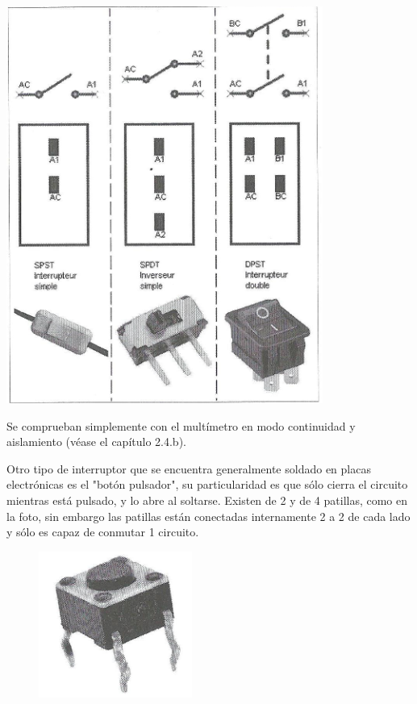 \documentclass[a5paper,twoside,openany]{book}
\begin{document}
\begin{minipage}[t]{0.6\textwidth}\vspace{0pt}
\includegraphics[width=\linewidth]{tipos-interruptores}
\end{minipage}
\vspace{1em}

Se comprueban simplemente con el multímetro en modo continuidad y aislamiento
(véase el capítulo 2.4.b).
\newpage

Otro tipo de interruptor que se encuentra generalmente soldado en placas electrónicas es el "botón pulsador", su particularidad es que sólo cierra el circuito mientras está pulsado, y lo abre al soltarse.
Existen de 2 y de 4 patillas, como en la foto, sin embargo las patillas están conectadas internamente 2 a 2 de cada lado y sólo es capaz de conmutar 1 circuito.

\begin{figure}[h]
\includegraphics[width=0.25\linewidth]{boton-pulsador}
\centering
\end{figure}
\end{document}
